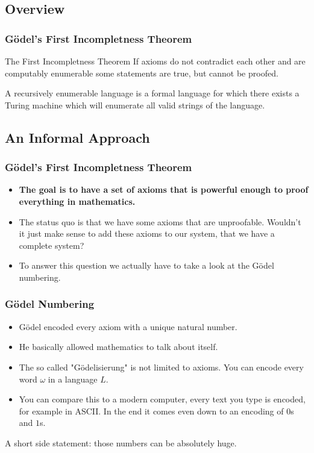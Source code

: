 \documentclass[aspectratio=169]{beamer}
\begin{document}
\subsection{Overview}
\begin{frame}
	\frametitle{Gödel's First Incompletness Theorem}
	\begin{block}{The First Incompletness Theorem}
		If axioms do not contradict each other and are computably enumerable some statements are true, but cannot be proofed.
	\end{block}
	\begin{Definition}
	A recursively enumerable language is a formal language for which there exists a Turing machine which will enumerate all valid strings of the language.
	\end{Definition}
\end{frame}
\begin{frame}
\subsection{An Informal Approach}
	\frametitle{Gödel's First Incompletness Theorem}
	\begin{itemize}
		\item \textbf{The goal is to have a set of axioms that is powerful enough to proof everything in mathematics.}
		\item The status quo is that we have some axioms that are unproofable. Wouldn't it just make sense to add these axioms to our system, that we have a complete system?
		\item To answer this question we actually have to take a look at the Gödel numbering.
	\end{itemize}
\end{frame}
\begin{frame}
	\frametitle{Gödel Numbering}
	\begin{itemize}
		\item Gödel encoded every axiom with a unique natural number.
		\item He basically allowed mathematics to talk about itself.
		\item The so called "Gödelisierung" is not limited to axioms. You can encode every word $\omega$ in a language $L$.
		\item You can compare this to a modern computer, every text you type is encoded, for example in ASCII. In the end it comes even down to an encoding of $0$s and $1$s.
	\end{itemize}
	A short side statement: those numbers can be absolutely huge.
\end{frame}
\end{document}
